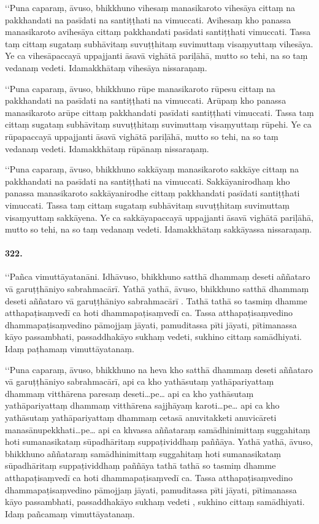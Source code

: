 ‘‘Puna caparaṃ, āvuso, bhikkhuno vihesaṃ manasikaroto vihesāya cittaṃ na pakkhandati na pasīdati na santiṭṭhati na vimuccati. Avihesaṃ kho panassa manasikaroto avihesāya cittaṃ pakkhandati pasīdati santiṭṭhati vimuccati. Tassa taṃ cittaṃ sugataṃ subhāvitaṃ suvuṭṭhitaṃ suvimuttaṃ visaṃyuttaṃ vihesāya. Ye ca vihesāpaccayā uppajjanti āsavā vighātā pariḷāhā, mutto so tehi, na so taṃ vedanaṃ vedeti. Idamakkhātaṃ vihesāya nissaraṇaṃ.

‘‘Puna caparaṃ, āvuso, bhikkhuno rūpe manasikaroto rūpesu cittaṃ na pakkhandati na pasīdati na santiṭṭhati na vimuccati. Arūpaṃ kho panassa manasikaroto arūpe cittaṃ pakkhandati pasīdati santiṭṭhati vimuccati. Tassa taṃ cittaṃ sugataṃ subhāvitaṃ suvuṭṭhitaṃ suvimuttaṃ visaṃyuttaṃ rūpehi. Ye ca rūpapaccayā uppajjanti āsavā vighātā pariḷāhā, mutto so tehi, na so taṃ vedanaṃ vedeti. Idamakkhātaṃ rūpānaṃ nissaraṇaṃ.

‘‘Puna caparaṃ, āvuso, bhikkhuno sakkāyaṃ manasikaroto sakkāye cittaṃ na pakkhandati na pasīdati na santiṭṭhati na vimuccati. Sakkāyanirodhaṃ kho panassa manasikaroto sakkāyanirodhe cittaṃ pakkhandati pasīdati santiṭṭhati vimuccati. Tassa taṃ cittaṃ sugataṃ subhāvitaṃ suvuṭṭhitaṃ suvimuttaṃ visaṃyuttaṃ sakkāyena. Ye ca sakkāyapaccayā uppajjanti āsavā vighātā pariḷāhā, mutto so tehi, na so taṃ vedanaṃ vedeti. Idamakkhātaṃ sakkāyassa nissaraṇaṃ.

\paragraph{322.} ‘‘Pañca vimuttāyatanāni. Idhāvuso, bhikkhuno satthā dhammaṃ deseti aññataro vā garuṭṭhāniyo sabrahmacārī. Yathā yathā, āvuso, bhikkhuno satthā dhammaṃ deseti aññataro vā garuṭṭhāniyo sabrahmacārī . Tathā tathā so tasmiṃ dhamme atthapaṭisaṃvedī ca hoti dhammapaṭisaṃvedī ca. Tassa atthapaṭisaṃvedino dhammapaṭisaṃvedino pāmojjaṃ jāyati, pamuditassa pīti jāyati, pītimanassa kāyo passambhati, passaddhakāyo sukhaṃ vedeti, sukhino cittaṃ samādhiyati. Idaṃ paṭhamaṃ vimuttāyatanaṃ.

‘‘Puna caparaṃ, āvuso, bhikkhuno na heva kho satthā dhammaṃ deseti aññataro vā garuṭṭhāniyo sabrahmacārī, api ca kho yathāsutaṃ yathāpariyattaṃ dhammaṃ vitthārena paresaṃ deseti…pe… api ca kho yathāsutaṃ yathāpariyattaṃ dhammaṃ vitthārena sajjhāyaṃ karoti…pe… api ca kho yathāsutaṃ yathāpariyattaṃ dhammaṃ cetasā anuvitakketi anuvicāreti manasānupekkhati…pe… api ca khvassa aññataraṃ samādhinimittaṃ suggahitaṃ hoti sumanasikataṃ sūpadhāritaṃ suppaṭividdhaṃ paññāya. Yathā yathā, āvuso, bhikkhuno aññataraṃ samādhinimittaṃ suggahitaṃ hoti sumanasikataṃ sūpadhāritaṃ suppaṭividdhaṃ paññāya tathā tathā so tasmiṃ dhamme atthapaṭisaṃvedī ca hoti dhammapaṭisaṃvedī ca. Tassa atthapaṭisaṃvedino dhammapaṭisaṃvedino pāmojjaṃ jāyati, pamuditassa pīti jāyati, pītimanassa kāyo passambhati, passaddhakāyo sukhaṃ vedeti , sukhino cittaṃ samādhiyati. Idaṃ pañcamaṃ vimuttāyatanaṃ.

